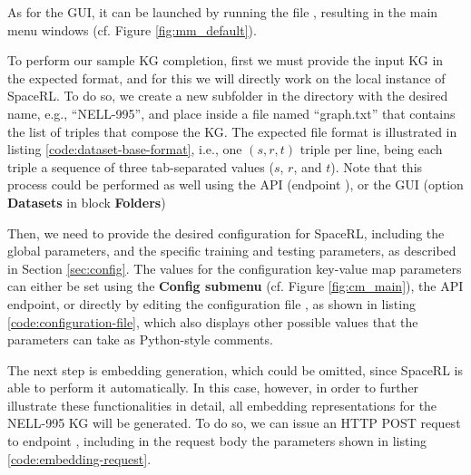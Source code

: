 As for the GUI, it can be launched by running the file , resulting in the main menu windows (cf. Figure \ref{fig:mm_default}).


To perform our sample KG completion, first we must provide the input KG in the expected format, and for this we will directly work on the local instance of SpaceRL. To do so, we create a new subfolder in the  directory with the desired name,  e.g., ``NELL-995'', and place inside a file named ``graph.txt'' that contains the list of triples that compose the KG. The expected file format is illustrated in listing \ref{code:dataset-base-format}, i.e., one $(s,r,t)$ triple per line, being each triple a sequence of three tab-separated values ($s$, $r$, and $t$). Note that this process could be performed as well using the API (endpoint ), or the GUI (option \textbf{Datasets} in block \textbf{Folders})



Then, we need to provide the desired configuration for SpaceRL, including the global parameters, and the specific training and testing parameters, as described in Section \ref{sec:config}. The values for the configuration key-value map parameters can either be set using the \textbf{Config submenu} (cf. Figure \ref{fig:cm_main}), the  API endpoint, or directly by editing the configuration file , as shown in listing \ref{code:configuration-file}, which also displays other possible values that the parameters can take as Python-style comments.



The next step is embedding generation, which could be omitted, since SpaceRL is able to perform it automatically. In this case, however, in order to further illustrate these functionalities in detail, all embedding representations for the NELL-995 KG will be generated. To do so, we can issue an HTTP POST request to endpoint , including in the request body the parameters shown in listing \ref{code:embedding-request}.

